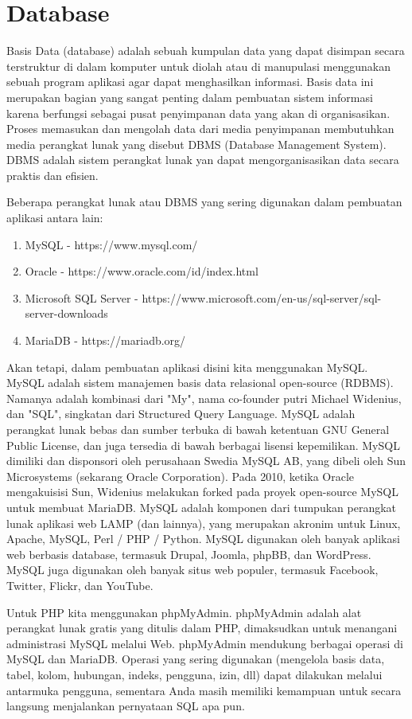 \section{Database}
Basis Data (database) adalah sebuah kumpulan data yang dapat disimpan secara terstruktur di dalam komputer untuk diolah atau di manupulasi menggunakan sebuah program aplikasi agar dapat menghasilkan informasi. Basis data ini merupakan bagian yang sangat penting dalam pembuatan sistem informasi karena berfungsi sebagai pusat penyimpanan data yang akan di organisasikan. Proses memasukan dan mengolah data dari media penyimpanan membutuhkan media perangkat lunak yang disebut DBMS (Database Management System). DBMS adalah sistem perangkat lunak yan dapat mengorganisasikan data secara praktis dan efisien.
\par
Beberapa perangkat lunak atau DBMS yang sering digunakan dalam pembuatan aplikasi antara lain:
\begin{enumerate}
\item MySQL - https://www.mysql.com/
\item Oracle - https://www.oracle.com/id/index.html
\item Microsoft SQL Server - https://www.microsoft.com/en-us/sql-server/sql-server-downloads
\item MariaDB - https://mariadb.org/
\end{enumerate}
Akan tetapi, dalam pembuatan aplikasi disini kita menggunakan MySQL.
\newline
MySQL adalah sistem manajemen basis data relasional open-source (RDBMS). Namanya adalah kombinasi dari "My", nama co-founder putri Michael Widenius, dan "SQL", singkatan dari Structured Query Language. MySQL adalah perangkat lunak bebas dan sumber terbuka di bawah ketentuan GNU General Public License, dan juga tersedia di bawah berbagai lisensi kepemilikan. MySQL dimiliki dan disponsori oleh perusahaan Swedia MySQL AB, yang dibeli oleh Sun Microsystems (sekarang Oracle Corporation). Pada 2010, ketika Oracle mengakuisisi Sun, Widenius melakukan forked pada proyek open-source MySQL untuk membuat MariaDB. MySQL adalah komponen dari tumpukan perangkat lunak aplikasi web LAMP (dan lainnya), yang merupakan akronim untuk Linux, Apache, MySQL, Perl / PHP / Python. MySQL digunakan oleh banyak aplikasi web berbasis database, termasuk Drupal, Joomla, phpBB, dan WordPress. MySQL juga digunakan oleh banyak situs web populer, termasuk Facebook, Twitter, Flickr, dan YouTube. 
\par
Untuk PHP kita menggunakan phpMyAdmin. phpMyAdmin adalah alat perangkat lunak gratis yang ditulis dalam PHP, dimaksudkan untuk menangani administrasi MySQL melalui Web. phpMyAdmin mendukung berbagai operasi di MySQL dan MariaDB. Operasi yang sering digunakan (mengelola basis data, tabel, kolom, hubungan, indeks, pengguna, izin, dll) dapat dilakukan melalui antarmuka pengguna, sementara Anda masih memiliki kemampuan untuk secara langsung menjalankan pernyataan SQL apa pun.
